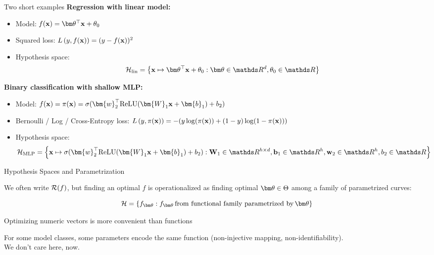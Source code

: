 \documentclass[11pt,compress,t,notes=noshow, xcolor=table]{beamer}
\begin{document}
\begin{frame}{Two short examples}
\textbf{Regression with linear model:}\\
\begin{itemize}
\item Model: $f(\xv) = \thetav^\top \xv + \theta_0$
\item Squared loss:  
$L\left(y, f(\mathbf{x})\right) = (y-f(\mathbf{x}))^2$
\item Hypothesis space: $$\Hspace_{\text{lin}} = \left\{ \xv \mapsto \thetav^\top \xv + \theta_0 : \thetav \in \R^d, \theta_0 \in \R \right\}$$
\end{itemize}

\vfill

\textbf{Binary classification with shallow MLP:}\\
\begin{itemize}
\item Model: $f(\xv) = \pi(\xv)= \sigma(\bm{w}_2^{\top} \text{ReLU}(\bm{W}_1 \xv + \bm{b}_1) + b_2)$
\item Bernoulli / Log / Cross-Entropy loss: $L\left(y, \pi(\mathbf{x})\right) = -(y\log(\pi(\mathbf{x}))+(1-y)\log(1-\pi(\mathbf{x})))$\\ 
\item Hypothesis space: {\small $$\Hspace_{\text{MLP}} = \left\{ \xv \mapsto \sigma(\bm{w}_2^{\top} \text{ReLU}(\bm{W}_1 \xv + \bm{b}_1) + b_2): \mathbf{W}_1 \in \R^{h \times d}, \mathbf{b}_1 \in \R^h, \mathbf{w}_2 \in \R^h, b_2 \in \R \right\}$$}
\end{itemize}
  
\end{frame}

\begin{frame}[c]{Hypothesis Spaces and Parametrization}

We often write $\mathcal{R}(f)$, but finding an optimal $f$ is operationalized as finding optimal $\thetav \in \Theta$ among a family of parametrized curves:
\vfill

$$\Hspace = \{f_{\thetav}: f_{\thetav}\,\text{from functional family parametrized by}\,\thetav\}$$

\vfill

\begin{itemizeL}
\item Optimizing numeric vectors is more convenient than functions
\item For some model classes, some parameters encode the same function (non-injective mapping, non-identifiability). \\
We don't care here, now. 
\end{itemizeL}

\end{frame}
\end{document}
